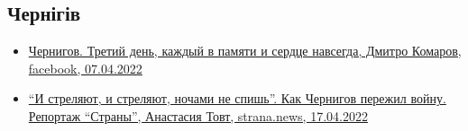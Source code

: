  
 
 
 
 

\subsection{Чернігів}
\label{sec:topics.vojna.chernigov}

\begin{itemize} %

\item \hyperlink{07_04_2022.fb.komarov_dmitrij.1.chernigov}{%
Чернигов. Третий день, каждый в памяти и сердце навсегда, Дмитро Комаров, facebook, 07.04.2022%
}

\item \hyperlink{17_04_2022.stz.news.ua.strana.1.chernigov}{
\enquote{И стреляют, и стреляют, ночами не спишь}. Как Чернигов пережил войну. Репортаж \enquote{Страны}, 
Анастасия Товт, strana.news, 17.04.2022
}

\end{itemize} %

